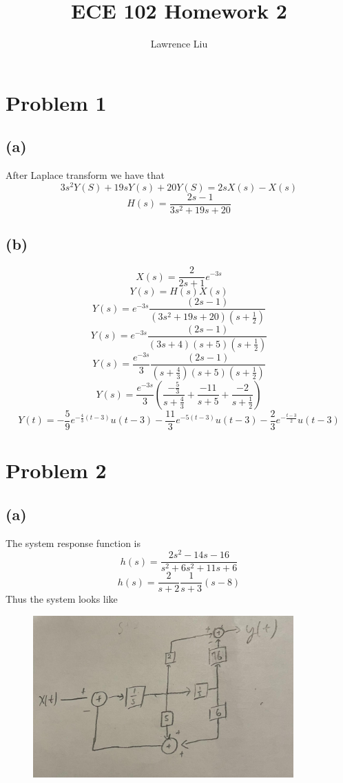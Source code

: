\documentclass[12pt]{article}
\title{ECE 102 Homework 2}
\author{Lawrence Liu}
\begin{document}
\maketitle
\section*{Problem 1}
\subsection*{(a)}
After Laplace transform we have that
$$3s^2Y(S)+19sY(s)+20Y(S)=2sX(s)-X(s)$$
$$H(s)=\boxed{\frac{2s-1}{3s^2+19s+20}}$$
\subsection*{(b)}
$$X(s)=\frac{2}{2s+1}e^{-3s}$$
$$Y(s)=H(s)X(s)$$
$$Y(s)=e^{-3s}\frac{(2s-1)}{(3s^2+19s+20)(s+\frac{1}{2})}$$
$$Y(s)=e^{-3s}\frac{(2s-1)}{(3s+4)(s+5)(s+\frac{1}{2})}$$
$$Y(s)=\frac{e^{-3s}}{3}\frac{(2s-1)}{(s+\frac{4}{3})(s+5)(s+\frac{1}{2})}$$
$$Y(s)=\frac{e^{-3s}}{3}\left(\frac{-\frac{5}{3}}{s+\frac{4}{3}}+\frac{-11}{s+5}+\frac{-2}{s+\frac{1}{2}}\right)$$
$$Y(t)=\boxed{-\frac{5}{9}e^{-\frac{4}{3}(t-3)}u(t-3)-\frac{11}{3}e^{-5(t-3)}u(t-3)-\frac{2}{3}e^{-\frac{t-3}{2}}u(t-3)}$$
\section*{Problem 2}
\subsection*{(a)}
The system response function is
$$h(s)=\frac{2s^2-14s-16}{s^2+6s^2+11s+6}$$
$$h(s)=\frac{2}{s+2}\frac{1}{s+3}(s-8)$$
Thus the system looks like
\begin{center}
\begin{figure}[h]\includegraphics[width=10cm]{fig1}
\end{figure}
\end{center}
\end{document}
